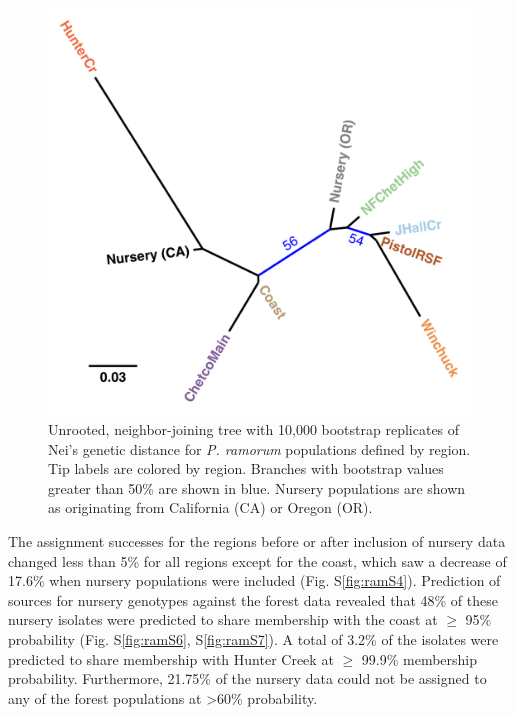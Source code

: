 \documentclass[double,12pt]{beavtex}
\begin{document}
  \begin{figure}
  
  {\centering \includegraphics[width=0.8\linewidth]{figure/phytopathology/figure_5} 
  
  }
  
  \caption[Unrooted, neighbor-joining tree with 10,000 bootstrap replicates of
  Nei's genetic distance for \emph{P. ramorum} populations defined by
  region.]{Unrooted, neighbor-joining tree with 10,000 bootstrap replicates of
  Nei's genetic distance for \emph{P. ramorum} populations defined by
  region. Tip labels are colored by region. Branches with bootstrap values
  greater than 50\% are shown in blue. Nursery populations are shown as
  originating from California (CA) or Oregon (OR).}\label{fig:ramorum5}
  \end{figure}
  
  \newpage
  
  The assignment successes for the regions before or after inclusion of
  nursery data changed less than 5\% for all regions except for the coast,
  which saw a decrease of 17.6\% when nursery populations were included
  (Fig. S\ref{fig:ramS4}). Prediction of sources for nursery genotypes
  against the forest data revealed that 48\% of these nursery isolates
  were predicted to share membership with the coast at \(\geq\) 95\%
  probability (Fig. S\ref{fig:ramS6}, S\ref{fig:ramS7}). A total of 3.2\%
  of the isolates were predicted to share membership with Hunter Creek at
  \(\geq\) 99.9\% membership probability. Furthermore, 21.75\% of the
  nursery data could not be assigned to any of the forest populations at
  \textgreater{}60\% probability.
  
\end{document}
